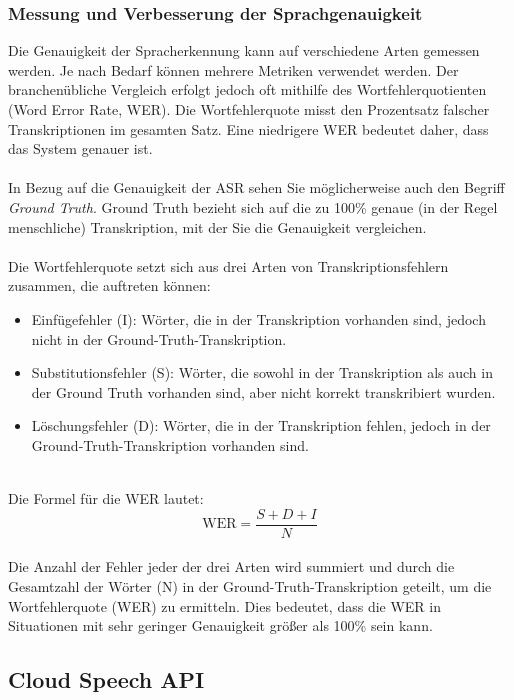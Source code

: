 \documentclass[12pt,a4paper]{article}
\begin{document}
\subsubsection{Messung und Verbesserung der Sprachgenauigkeit}
Die Genauigkeit der Spracherkennung kann auf verschiedene Arten gemessen werden. Je nach Bedarf können mehrere Metriken verwendet werden. Der branchenübliche Vergleich erfolgt jedoch oft mithilfe des Wortfehlerquotienten (Word Error Rate, WER). Die Wortfehlerquote misst den Prozentsatz falscher Transkriptionen im gesamten Satz. Eine niedrigere WER bedeutet daher, dass das System genauer ist.
\\ \\
In Bezug auf die Genauigkeit der ASR sehen Sie möglicherweise auch den Begriff \textit{Ground Truth}. Ground Truth bezieht sich auf die zu 100\% genaue (in der Regel menschliche) Transkription, mit der Sie die Genauigkeit vergleichen.
\\ \\
Die Wortfehlerquote setzt sich aus drei Arten von Transkriptionsfehlern zusammen, die auftreten können:

\begin{itemize}
	\item Einfügefehler (I): Wörter, die in der Transkription vorhanden sind, jedoch nicht in der Ground-Truth-Transkription.
	\item Substitutionsfehler (S): Wörter, die sowohl in der Transkription als auch in der Ground Truth vorhanden sind, aber nicht korrekt transkribiert wurden.
	\item Löschungsfehler (D): Wörter, die in der Transkription fehlen, jedoch in der Ground-Truth-Transkription vorhanden sind.
\end{itemize}
\ \\
Die Formel für die WER lautet: 
\[ \text{WER} = \frac{S + D + I}{N} \]
\\
Die Anzahl der Fehler jeder der drei Arten wird summiert und durch die Gesamtzahl der Wörter (N) in der Ground-Truth-Transkription geteilt, um die Wortfehlerquote (WER) zu ermitteln. Dies bedeutet, dass die WER in Situationen mit sehr geringer Genauigkeit größer als 100\% sein kann.
\subsection{Cloud Speech API}
\end{document}
